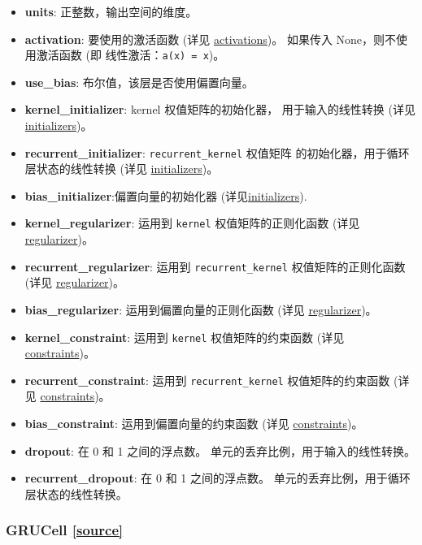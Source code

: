 \begin{itemize}
\tightlist
\item
  \textbf{units}: 正整数，输出空间的维度。
\item
  \textbf{activation}: 要使用的激活函数 (详见
  \hyperref[activations]{activations})。 如果传入
  None，则不使用激活函数 (即 线性激活：\texttt{a(x)\ =\ x})。
\item
  \textbf{use\_bias}: 布尔值，该层是否使用偏置向量。
\item
  \textbf{kernel\_initializer}: kernel 权值矩阵的初始化器，
  用于输入的线性转换 (详见 \hyperref[initializers]{initializers})。
\item
  \textbf{recurrent\_initializer}: \texttt{recurrent\_kernel} 权值矩阵
  的初始化器，用于循环层状态的线性转换 (详见
  \hyperref[initializers]{initializers})。
\item
  \textbf{bias\_initializer}:偏置向量的初始化器
  (详见\hyperref[initializers]{initializers}).
\item
  \textbf{kernel\_regularizer}: 运用到 \texttt{kernel}
  权值矩阵的正则化函数 (详见 \hyperref[regularizers]{regularizer})。
\item
  \textbf{recurrent\_regularizer}: 运用到 \texttt{recurrent\_kernel}
  权值矩阵的正则化函数 (详见 \hyperref[regularizers]{regularizer})。
\item
  \textbf{bias\_regularizer}: 运用到偏置向量的正则化函数 (详见
  \hyperref[regularizers]{regularizer})。
\item
  \textbf{kernel\_constraint}: 运用到 \texttt{kernel} 权值矩阵的约束函数
  (详见 \hyperref[constraints]{constraints})。
\item
  \textbf{recurrent\_constraint}: 运用到 \texttt{recurrent\_kernel}
  权值矩阵的约束函数 (详见 \hyperref[constraints]{constraints})。
\item
  \textbf{bias\_constraint}: 运用到偏置向量的约束函数 (详见
  \hyperref[constraints]{constraints})。
\item
  \textbf{dropout}: 在 0 和 1 之间的浮点数。
  单元的丢弃比例，用于输入的线性转换。
\item
  \textbf{recurrent\_dropout}: 在 0 和 1 之间的浮点数。
  单元的丢弃比例，用于循环层状态的线性转换。
\end{itemize}




\subsubsection{GRUCell {\href{https://github.com/keras-team/keras/blob/master/keras/layers/recurrent.py\#L1138}{{[}source{]}}}}

